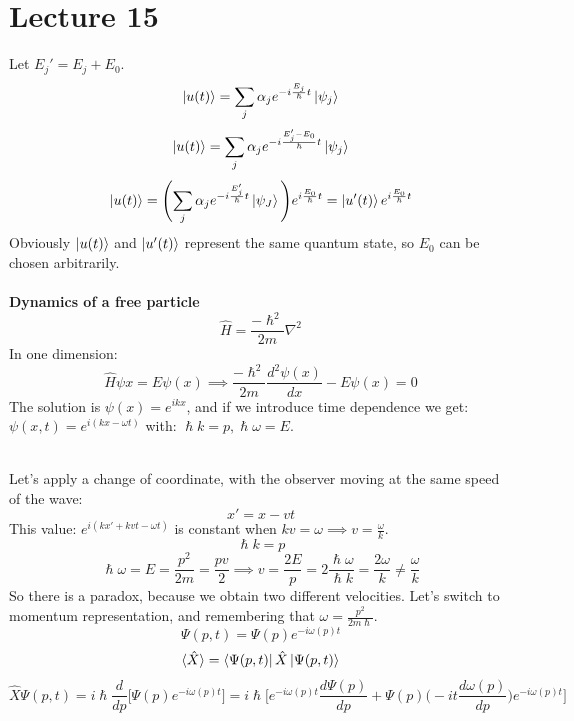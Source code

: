 \documentclass{article}
\begin{document}
\section{Lecture 15}
Let $E_j' = E_j + E_0$.
$$\ket{u(t)} = \sum_j \alpha_j e^{-i\frac{E_j}{\hslash}t} \ket{\psi_j}$$
$$\ket{u(t)} = \sum_j \alpha_j e^{-i\frac{E_j'-E_0}{\hslash}t} \ket{\psi_j} $$
$$\ket{u(t)} = \Biggl( \sum_j \alpha_j e^{-i\frac{E_j'}{\hslash}t} \ket{\psi_J} \Biggl) e^{i \frac{E_0}{\hslash}t} = \ket{u'(t)}  e^{i \frac{E_0}{\hslash}t} $$
Obviously $\ket{u(t)}$ and $\ket{u'(t)}$ represent the same quantum state, so $E_0$ can be chosen arbitrarily. \\ \\
\textbf{Dynamics of a free particle}
$$\hat{H} = \frac{-\hslash^2}{2m} \nabla^2$$
In one dimension:
$$\hat{H}\psi{x} = E \psi(x) \implies \frac{-\hslash^2}{2m} \frac{d^2 \psi(x)}{dx} - E \psi(x) = 0$$
The solution is $\psi(x) = e^{ikx}$, and if we introduce time dependence we get: $ \psi(x,t) = e^{i(kx-\omega t)}$ with: $ \hslash k = p, \hslash \omega = E.$

 \\
Let's apply a change of coordinate, with the observer moving at the same speed of the wave:
$$x'=x-vt$$
This value: $ e^{i(kx'+kvt-\omega t)}$ is constant when $kv = \omega \implies v = \frac{\omega}{k}$.
$$\hslash k = p$$
$$\hslash \omega = E= \frac{p^2}{2m} = \frac{pv}{2} \implies v = \frac{2E}{p} = 2\frac{\hslash \omega}{\hslash k} = \frac{2\omega}{k}\neq \frac{\omega}{k}$$
So there is a paradox, because we obtain two different velocities.
Let's switch to momentum representation, and remembering that $\omega = \frac{p^2}{2m\hslash}$.
$$\Psi(p,t) = \Psi(p) e^{-i\omega (p) t}$$
$$\langle \hat{X} \rangle = \bra{\Psi(p,t)} \hat{X} \ket{\Psi (p,t)}$$
$$\hat{X}\Psi(p,t) = i\hslash\frac{d}{dp} \biggl[ \Psi(p) e^{-i\omega(p)t} \biggl] = i \hslash \biggl[ e^{-i\omega (p) t} \frac{d \Psi(p)}{dp} + \Psi(p) \biggl(-it \frac{d\omega(p)}{dp} \biggl)  e^{-i \omega(p)t} \biggl] $$
\end{document}
